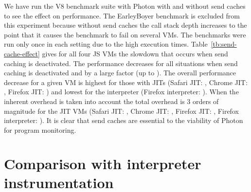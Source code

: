 We have run the V8 benchmark suite with Photon with and without send
caches to see the effect on performance.  The EarleyBoyer benchmark is
excluded from this experiment because without send caches the call
stack depth increases to the point that it causes the benchmark to
fail on several VMs.  The benchmarks were run only once in each
setting due to the high execution
times. Table~\ref{tb:send-cache-effect} gives for all four JS VMs the
slowdown that occurs when send caching is deactivated.  The
performance decreases for all situations when send caching is
deactivated and by a large factor (up to ).  The overall
performance decrease for a given VM is highest for those with JITs
(Safari JIT: , Chrome JIT: , Firefox JIT: ) and
lowest for the interpreter (Firefox interpreter: ).  When the
inherent overhead is taken into account the total overhead is 3 orders
of magnitude for the JIT VMs (Safari JIT: , Chrome JIT: ,
Firefox JIT: , Firefox interpreter: ).  It is clear that send
caches are essential to the viability of Photon for program
monitoring.

\section{Comparison with interpreter instrumentation}


